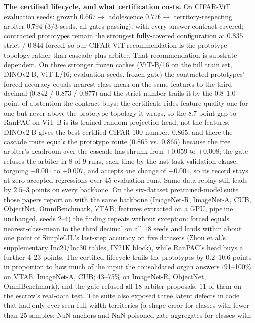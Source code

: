 \documentclass{article}
\begin{document}
\textbf{The certified lifecycle, and what certification costs.} On CIFAR-ViT
evaluation seeds: growth $0.667 \to$ adolescence $0.776 \to$
territory-respecting arbiter $0.794$ ($3/3$ seeds, all gates passing), with
every answer contract-covered; contracted prototypes remain the strongest
fully-covered configuration at $0.835$ strict / $0.844$ forced, so our
CIFAR-ViT recommendation is the prototype topology rather than
cascade-plus-arbiter. That recommendation is substrate-dependent. On three
stronger frozen caches (ViT-B/16 on the full train set, DINOv2-B, ViT-L/16;
evaluation seeds, frozen gate) the contracted prototypes' forced accuracy
equals nearest-class-mean on the same features to the third decimal
(0.842 / 0.873 / 0.877) and the strict number trails it by the $0.8$--$1.0$
point of abstention the contract buys: the certificate rides feature quality
one-for-one but never above the prototype topology it wraps, so the $8.7$-point
gap to RanPAC on ViT-B is its trained random-projection head, not the
features. DINOv2-B gives the best certified CIFAR-100 number, $0.865$, and
there the cascade route equals the prototype route ($0.865$ vs.\ $0.865$)
because the free arbiter's headroom over the cascade has shrunk from
$+0.059$ to $+0.008$; the gate refuses the arbiter in $8$ of $9$ runs, each
time by the last-task validation clause, forgoing $+0.001$ to $+0.007$,
and accepts one change of $+0.001$, so its record stays at zero accepted
regressions over $45$ evaluation runs. Same-data replay still leads by
$2.5$--$3$ points on every backbone. On the six-dataset pretrained-model suite those papers
report on with the same backbone (ImageNet-R, ImageNet-A, CUB, ObjectNet,
OmniBenchmark, VTAB; features extracted on a GPU, pipeline unchanged, seeds
2--4) the finding repeats without exception: forced equals nearest-class-mean
to the third decimal on all $18$ seeds and lands within about one point of
SimpleCIL's last-step accuracy on five datasets (Zhou et al.'s supplementary
Inc20/Inc30 tables, IN21K block), while RanPAC's head buys a further $4$--$23$
points. The certified lifecycle trails the prototypes by $0.2$--$10.6$ points in
proportion to how much of the input the consolidated organ answers (91--100\%
on VTAB, ImageNet-A, CUB; 43--75\% on ImageNet-R, ObjectNet, OmniBenchmark),
and the gate refused all $18$ arbiter proposals, $11$ of them on the escrow's
real-data test. The suite also exposed three latent defects in code that had
only ever seen full-width territories (a shape error for classes with fewer
than 25 samples; NaN anchors and NaN-poisoned gate aggregates for classes with
\end{document}
